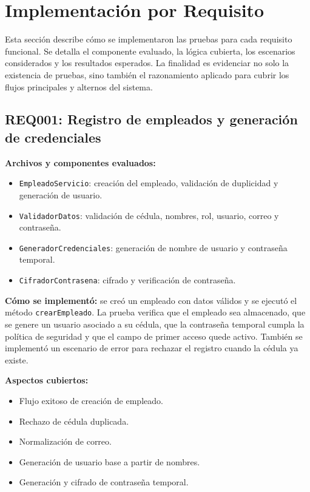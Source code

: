 \documentclass[12pt,a4paper]{article}
\begin{document}
\section{Implementación por Requisito}

Esta sección describe cómo se implementaron las pruebas para cada requisito funcional. Se detalla el componente evaluado, la lógica cubierta, los escenarios considerados y los resultados esperados. La finalidad es evidenciar no solo la existencia de pruebas, sino también el razonamiento aplicado para cubrir los flujos principales y alternos del sistema.

\subsection{REQ001: Registro de empleados y generación de credenciales}

\textbf{Archivos y componentes evaluados:}
\begin{itemize}[leftmargin=*]
    \item \texttt{EmpleadoServicio}: creación del empleado, validación de duplicidad y generación de usuario.
    \item \texttt{ValidadorDatos}: validación de cédula, nombres, rol, usuario, correo y contraseña.
    \item \texttt{GeneradorCredenciales}: generación de nombre de usuario y contraseña temporal.
    \item \texttt{CifradorContrasena}: cifrado y verificación de contraseña.
\end{itemize}

\textbf{Cómo se implementó:} se creó un empleado con datos válidos y se ejecutó el método \texttt{crearEmpleado}. La prueba verifica que el empleado sea almacenado, que se genere un usuario asociado a su cédula, que la contraseña temporal cumpla la política de seguridad y que el campo de primer acceso quede activo. También se implementó un escenario de error para rechazar el registro cuando la cédula ya existe.

\textbf{Aspectos cubiertos:}
\begin{itemize}[leftmargin=*]
    \item Flujo exitoso de creación de empleado.
    \item Rechazo de cédula duplicada.
    \item Normalización de correo.
    \item Generación de usuario base a partir de nombres.
    \item Generación y cifrado de contraseña temporal.
\end{itemize}
\end{document}
